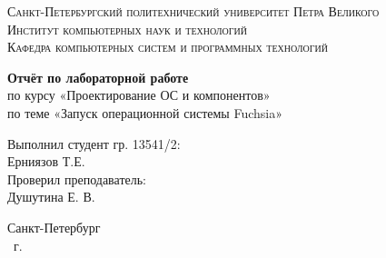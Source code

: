 \begin{titlepage}
    \centering
    \textsc{Санкт-Петербургский политехнический университет Петра Великого}\\[3mm]
    \textsc{Институт компьютерных наук и технологий}\\[3mm]
    \textsc{Кафедра компьютерных систем и программных технологий}
	
	\vfill
	
	\textbf{Отчёт по лабораторной работе}\\[3mm]
	по курсу «Проектирование ОС и компонентов»\\[3mm]
	по теме «Запуск операционной системы Fuchsia»\\[41mm]
	
    \begin{flushright}
	\begin{minipage}{.35\textwidth}
		Выполнил студент гр. 13541/2:\\
		Ерниязов Т.Е.\\[3mm]
		Проверил преподаватель:\\
		Душутина Е. В.
	\end{minipage}
    \end{flushright}
	
	\vfill

	Санкт-Петербург\\
	\the\year\ г.
\end{titlepage}

